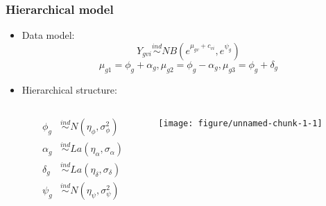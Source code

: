 \documentclass[handout]{beamer}\usepackage[]{graphicx}\usepackage[]{color}
\newenvironment{knitrout}{}{} %
\begin{document}
\begin{frame}[fragile]
\frametitle{Hierarchical model}
\begin{itemize}
\item Data model:
\[ Y_{gvi} \stackrel{ind}{\sim} NB\left(e^{\mu_{gv}+c_{vi}},e^{\psi_g}\right) \]
\[ \mu_{g1} = \phi_g + \alpha_g, \mu_{g2} = \phi_g-\alpha_g, \mu_{g3} = \phi_g + \delta_g \]

\pause

\item Hierarchical structure:
\begin{columns}
\begin{column}{0.5\linewidth}
\[ \begin{array}{rl}
\phi_g &\stackrel{ind}{\sim} N(\eta_\phi, \sigma_\phi^2) \\
\alpha_g &\stackrel{ind}{\sim} La(\eta_\alpha, \sigma_\alpha) \\
\delta_g &\stackrel{ind}{\sim} La(\eta_\delta, \sigma_\delta) \\
\psi_g &\stackrel{ind}{\sim} N(\eta_\psi, \sigma_\psi^2) 
\end{array} \]
\end{column} \pause
\begin{column}{0.5\linewidth}
\begin{knitrout}\tiny
{}\color{fgcolor}

{\centering \texttt{[image: figure/unnamed-chunk-1-1]} 

}



\end{knitrout}
\end{column}
\end{columns}
\end{itemize}
\end{frame}


\end{document}
